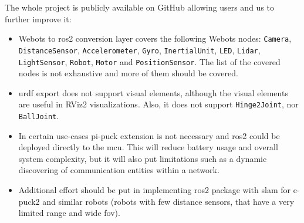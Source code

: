 The whole project is publicly available on GitHub allowing users and us to further improve it:
\begin{itemize}
    \item Webots to \ac{ros2} conversion layer covers the following Webots nodes: \texttt{Camera}, \texttt{DistanceSensor}, \texttt{Accelerometer}, \texttt{Gyro}, \texttt{InertialUnit}, \texttt{LED}, \texttt{Lidar}, \texttt{LightSensor}, \texttt{Robot}, \texttt{Motor} and \texttt{PositionSensor}. The list of the covered nodes is not exhaustive and more of them should be covered.
    \item \ac{urdf} export does not support visual elements, although the visual elements are useful in RViz2 visualizations. Also, it does not support \texttt{Hinge2Joint}, nor \texttt{BallJoint}.
    \item In certain use-cases pi-puck extension is not necessary and \ac{ros2} could be deployed directly to the \ac{mcu}.
    This will reduce battery usage and overall system complexity, but it will also put limitations such as a dynamic discovering of communication entities within a network.
    \item Additional effort should be put in implementing \ac{ros2} package with \ac{slam} for e-puck2 and similar robots (robots with few distance sensors, that have a very limited range and wide \ac{fov}). 
\end{itemize}
